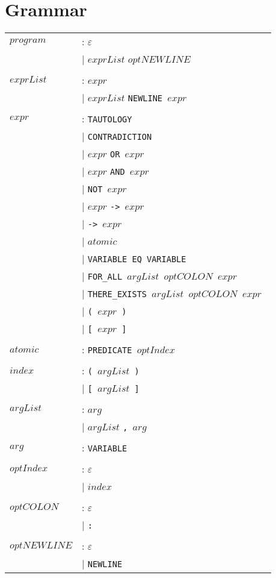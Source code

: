 \section{Grammar}
	\label{sec:appendixParser}

	\begin{tabular}{ll}
	$program$ & :    $\varepsilon$ \\
	{} & $\mid$      $exprList$ $optNEWLINE$ \\
	\\

	$exprList$ & :   $expr$ \\
	{} & $\mid$      $exprList$ \tt{NEWLINE} $expr$ \\
	\\

	$expr$ & :       \tt{TAUTOLOGY} \\
	{} & $\mid$      \tt{CONTRADICTION} \\
	{} & $\mid$      $expr$ \tt{OR} $expr$ \\
	{} & $\mid$      $expr$ \tt{AND} $expr$ \\
	{} & $\mid$      \tt{NOT} $expr$ \\
	{} & $\mid$      $expr$ \tt{->} $expr$ \\
	{} & $\mid$      \tt{->} $expr$ \\
	{} & $\mid$      $atomic$ \\
	{} & $\mid$      \tt{VARIABLE EQ VARIABLE} \\
	{} & $\mid$      \tt{FOR\_ALL} $argList$ $optCOLON$ $expr$ \\
	{} & $\mid$      \tt{THERE\_EXISTS} $argList$ $optCOLON$ $expr$ \\
	{} & $\mid$      \tt{(} $expr$ \tt{)} \\
	{} & $\mid$      \tt{[} $expr$ \tt{]} \\
	\\

	$atomic$ & :     \tt{PREDICATE} $optIndex$ \\
	\\

	$index$ & :      \tt{(} $argList$ \tt{)} \\
	{} & $\mid$      \tt{[} $argList$ \tt{]} \\
	\\

	$argList$ & :    $arg$ \\
	{} & $\mid$      $argList$ \tt{,} $arg$ \\
	\\

	$arg$ & :        \tt{VARIABLE} \\
	\\

	$optIndex$ & :   $\varepsilon$ \\
	{} & $\mid$      $index$ \\
	\\

	$optCOLON$ & :   $\varepsilon$ \\
	{} & $\mid$      \tt{:} \\
	\\

	$optNEWLINE$ & : $\varepsilon$ \\
	{} & $\mid$      \tt{NEWLINE}
	\end{tabular}
